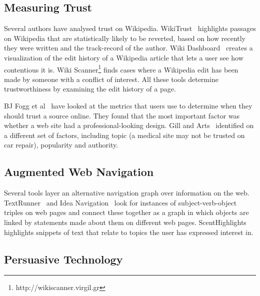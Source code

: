 \documentclass{www2010-submission}
\newcommand{\todo}[1]{}
\begin{document}
\cite{Something by Ed CHi about this}

\todo{Talk about textual entailment}

\todo{Talk about MemeTracker}


\subsection{Measuring Trust}

Several authors have analysed trust on Wikipedia. WikiTrust~\cite{Adler2008a} highlights passages on Wikipedia that are statistically likely to be reverted, based on how recently they were written and the track-record of the author. Wiki Dashboard~\cite{Kittur2008} creates a visualization of the edit history of a Wikipedia article that lets a user see how contentious it is. Wiki Scanner\footnote{http://wikiscanner.virgil.gr} finds cases where a Wikipedia edit has been made by someone with a conflict of interest. All these tools determine trustworthiness by examining the edit history of a page.

BJ Fogg et al~\cite{Fogg2000, Fogg2003} have looked at the metrics that users use to determine when they should trust a source online. They found that the most important factor was whether a web site had a professional-looking design. Gill and Arts~\cite{Gil2006} identified on a different set of factors, including topic (a medical site may not be trusted on car repair), popularity and authority.



\subsection{Augmented Web Navigation}

Several tools layer an alternative navigation graph over information on the web. TextRunner~\cite{Etzioni2008} and Idea Navigation~\cite{Etzioni2008} look for instances of subject-verb-object triples on web pages and connect these together as a graph in which objects are linked by statements made about them on different web pages. ScentHighlights~\cite{Chi2005a} highlights snippets of text that relate to topics the user has expressed interest in. 


\subsection{Persuasive Technology}

% 
\end{document}
